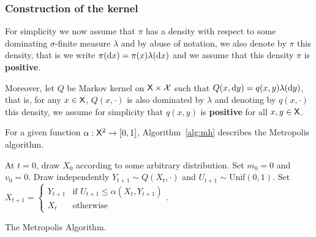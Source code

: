 \documentclass[english,graybox,envcountchap,envcountsame,sectrefs,shortlabels]{svmono}
\theoremstyle{style}
\begin{document}
\subsubsection{Construction of the kernel\label{subsec:construc}}

For simplicity we now assume that $\pi$ has a density with respect
to some dominating $\sigma$-finite measure $\lambda$ and by abuse
of notation, we also denote by $\pi$ this density, that is we write
$\pi(\mathrm{d} x)=\pi(x)\lambda(\mathrm{d} x)$ and we assume that this density
$\pi$ is \textbf{positive}.

Moreover, let $Q$ be Markov kernel on $\mathsf{X}\times\mathcal{X}$ such
that $Q(x,\mathrm{d} y)=q(x,y)\lambda(\mathrm{d} y)$, that is, for any $x\in\mathsf{X}$,
$Q(x,\cdot)$ is also dominated by $\lambda$ and denoting by $q(x,\cdot)$
this density, we assume for simplicity that $q(x,y)$ is \textbf{positive}
for all $x,y\in\mathsf{X}$. 

For a given function $\alpha:\mathsf{X}^{2}\to[0,1]$,  Algorithm~\ref{alg:mh} describes the Metropolis algorithm.

%

\begin{algorithm}
\centering
\begin{algorithmic}
\State At $t=0$, draw $X_{0}$ according to some arbitrary distribution.
\State Set $m_{0} = 0$ and $v_{0} = 0$.
\State Draw independently $Y_{t+1}\sim Q(X_{t},\cdot)$ and $U_{t+1}\sim\mathrm{Unif}(0,1)$.
\State Set $X_{t+1}=\begin{cases} Y_{t+1} & \mbox{if }U_{t+1}\leq\alpha(X_{t},Y_{t+1})\\ X_{t} & \mbox{otherwise} \end{cases}$. 
\EndFor
\end{algorithmic}
\caption{The Metropolis Algorithm.}
\label{alg:ùh}
\end{algorithm}
\end{document}
